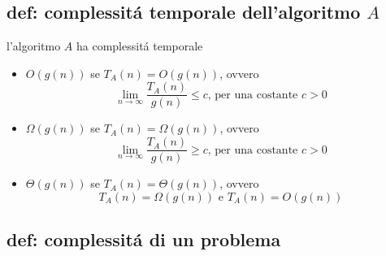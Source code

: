\subsection{def: complessit\'a temporale dell'algoritmo $A$}
\begin{flushleft}
	l'algoritmo $A$ ha complessit\'a temporale
	\begin{itemize}
		\item $O(g(n))$ se $T_{A}(n)=O(g(n))$, ovvero $$\lim_{n\to\infty}\frac{T_{A}(n)}{g(n)}\leq c\text{, per una costante }c>0$$
		\item $\Omega(g(n))$ se $T_{A}(n)=\Omega(g(n))$, ovvero $$\lim_{n\to\infty}\frac{T_{A}(n)}{g(n)}\geq c\text{, per una costante }c>0$$
		\item $\Theta(g(n))$ se $T_{A}(n)=\Theta(g(n))$, ovvero $$T_{A}(n)=\Omega(g(n))\text{ e
			}T_{A}(n)=O(g(n))$$
	\end{itemize}
\end{flushleft}

\subsection{def: complessit\'a di un problema}

\pagebreak
